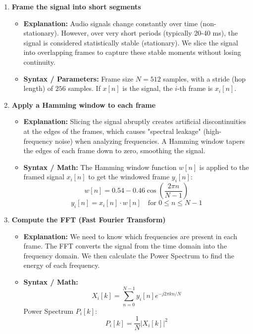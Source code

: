 \begin{enumerate}
  
  \item \textbf{Frame the signal into short segments}
  \begin{itemize}
      \item \textbf{Explanation:} Audio signals change constantly over time (non-stationary). However, over very short periods (typically 20-40 ms), the signal is considered statistically stable (stationary). We slice the signal into overlapping frames to capture these stable moments without losing continuity.
      \item \textbf{Syntax / Parameters:} Frame size $N = 512$ samples, with a stride (hop length) of $256$ samples. If $x[n]$ is the signal, the $i$-th frame is $x_i[n]$.
  \end{itemize}

  \item \textbf{Apply a Hamming window to each frame}
  \begin{itemize}
      \item \textbf{Explanation:} Slicing the signal abruptly creates artificial discontinuities at the edges of the frames, which causes "spectral leakage" (high-frequency noise) when analyzing frequencies. A Hamming window tapers the edges of each frame down to zero, smoothing the signal.
      \item \textbf{Syntax / Math:} The Hamming window function $w[n]$ is applied to the framed signal $x_i[n]$ to get the windowed frame $y_i[n]$:
      \begin{equation}
          w[n] = 0.54 - 0.46 \cos\left(\frac{2\pi n}{N-1}\right)
      \end{equation}
      \begin{equation}
          y_i[n] = x_i[n] \cdot w[n] \quad \text{for } 0 \le n \le N-1
      \end{equation}
  \end{itemize}

  \item \textbf{Compute the FFT (Fast Fourier Transform)}
  \begin{itemize}
      \item \textbf{Explanation:} We need to know which frequencies are present in each frame. The FFT converts the signal from the time domain into the frequency domain. We then calculate the Power Spectrum to find the energy of each frequency.
      \item \textbf{Syntax / Math:}
      \begin{equation}
          X_i[k] = \sum_{n=0}^{N-1} y_i[n] e^{-j 2\pi k n / N}
      \end{equation}
      Power Spectrum $P_i[k]$:
      \begin{equation}
          P_i[k] = \frac{1}{N} |X_i[k]|^2
      \end{equation}
  \end{itemize}


\end{enumerate}
